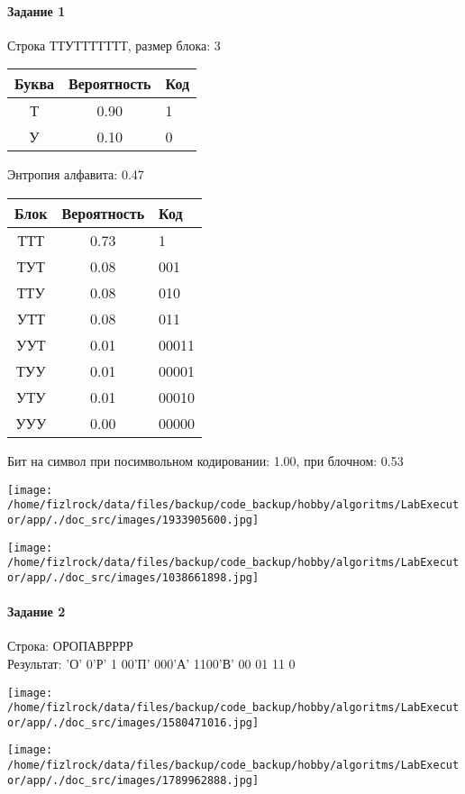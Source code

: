 \documentclass[a4paper, 12pt]{article}
\begin{document}
\paragraph{Задание 1}

Строка ТТУТТТТТТТ, размер блока: 3
\begin{center}
 \begin{tabular}{ |c|c|l| } 
  \hline
     Буква & Вероятность & Код\\ \hline
Т & 0.90 & 1\\\hline
У & 0.10 & 0
\\ \hline \end{tabular}
\end{center}
Энтропия алфавита: 0.47
\begin{center}
 \begin{tabular}{ |c|c|l| } 
  \hline
     Блок & Вероятность & Код\\ \hline
ТТТ & 0.73 & 1\\\hline
ТУТ & 0.08 & 001\\\hline
ТТУ & 0.08 & 010\\\hline
УТТ & 0.08 & 011\\\hline
УУТ & 0.01 & 00011\\\hline
ТУУ & 0.01 & 00001\\\hline
УТУ & 0.01 & 00010\\\hline
УУУ & 0.00 & 00000
\\ \hline \end{tabular}
\end{center}
Бит на символ при посимвольном кодировании: 1.00, при блочном: 0.53

\texttt{[image: /home/fizlrock/data/files/backup/code\_backup/hobby/algoritms/LabExecutor/app/./doc\_src/images/1933905600.jpg]}

\texttt{[image: /home/fizlrock/data/files/backup/code\_backup/hobby/algoritms/LabExecutor/app/./doc\_src/images/1038661898.jpg]}
\pagebreak
\paragraph{Задание 2}

Строка: 
ОРОПАВРРРР\\
Результат: 'О' 0'Р' 1 00'П' 000'А' 1100'В' 00 01 11 0

\texttt{[image: /home/fizlrock/data/files/backup/code\_backup/hobby/algoritms/LabExecutor/app/./doc\_src/images/1580471016.jpg]}

\texttt{[image: /home/fizlrock/data/files/backup/code\_backup/hobby/algoritms/LabExecutor/app/./doc\_src/images/1789962888.jpg]}
\end{document}
